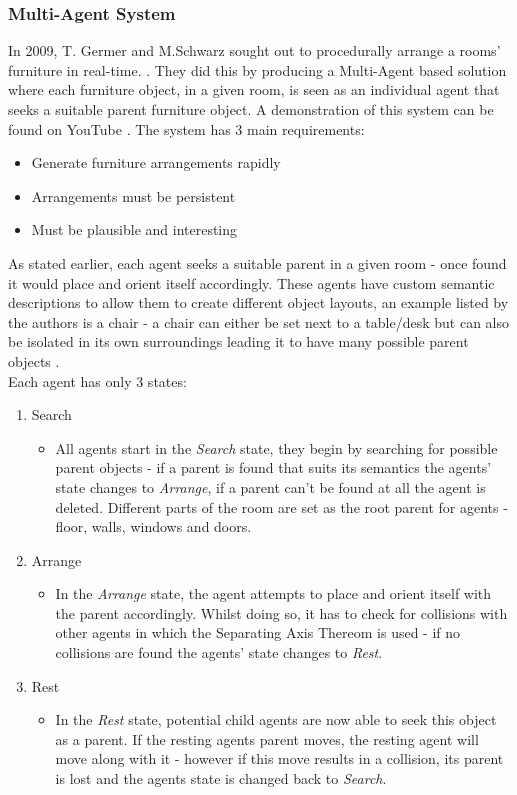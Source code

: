 \subsubsection*{Multi-Agent System}
In 2009, T. Germer and M.Schwarz sought out to procedurally arrange a rooms' furniture in real-time. \cite{real-time-walkthroughs}. They did this by producing a Multi-Agent based solution where each furniture object, in a given room, is seen as an individual agent that seeks a suitable parent furniture object. A demonstration of this system can be found on YouTube \cite{youtube:real-time-walkthroughs}.
The system has 3 main requirements: \cite{real-time-walkthroughs}
\begin{itemize}
    \item Generate furniture arrangements rapidly
    \item Arrangements must be persistent
    \item Must be plausible and interesting
\end{itemize}
As stated earlier, each agent seeks a suitable parent in a given room - once found it would place and orient itself accordingly. These agents have custom semantic descriptions to allow them to create different object layouts, an example listed by the authors is a chair - a chair can either be set next to a table/desk but can also be isolated in its own surroundings leading it to have many possible parent objects \cite{real-time-walkthroughs}.\\
Each agent has only 3 states:
\begin{enumerate}
    \item Search
        \begin{itemize}
            \item All agents start in the \textit{Search} state, they begin by searching for possible parent objects - if a parent is found that suits its semantics the agents' state changes to \textit{Arrange}, if a parent can't be found at all the agent is deleted. Different parts of the room are set as the root parent for agents - floor, walls, windows and doors.
        \end{itemize}
    \item Arrange
        \begin{itemize}
            \item In the \textit{Arrange} state, the agent attempts to place and orient itself with the parent accordingly. Whilst doing so, it has to check for collisions with other agents in which the Separating Axis Thereom is used \cite{separating-axis-thereom} - if no collisions are found the agents' state changes to \textit{Rest}.
        \end{itemize}
    \item Rest
        \begin{itemize}
            \item In the \textit{Rest} state, potential child agents are now able to seek this object as a parent. If the resting agents parent moves, the resting agent will move along with it - however if this move results in a collision, its parent is lost and the agents state is changed back to \textit{Search}.
        \end{itemize}
\end{enumerate}
